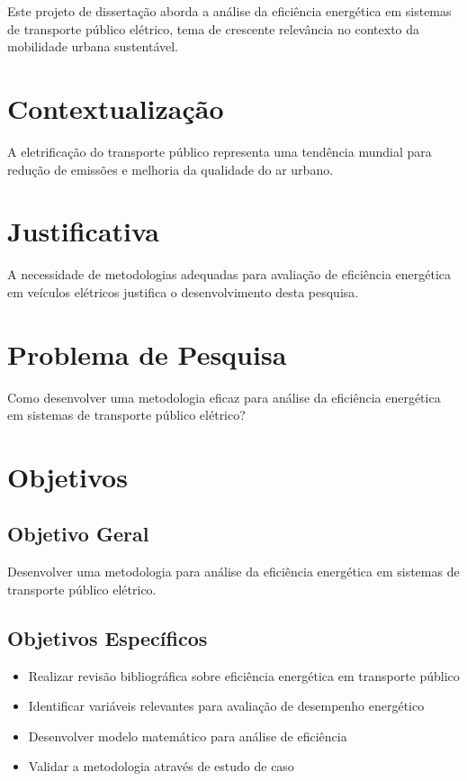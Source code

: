 \documentclass[qualificacao-mestrado,onehalfspacing,12pt,hyperref]{UnB-PPGT}
\begin{document}
Este projeto de dissertação aborda a análise da eficiência energética em sistemas de transporte público elétrico, tema de crescente relevância no contexto da mobilidade urbana sustentável.

\section{Contextualização}
\label{sec:contextualizacao}

A eletrificação do transporte público representa uma tendência mundial para redução de emissões e melhoria da qualidade do ar urbano.

\section{Justificativa}
\label{sec:justificativa}

A necessidade de metodologias adequadas para avaliação de eficiência energética em veículos elétricos justifica o desenvolvimento desta pesquisa.

\section{Problema de Pesquisa}
\label{sec:problema}

Como desenvolver uma metodologia eficaz para análise da eficiência energética em sistemas de transporte público elétrico?

\section{Objetivos}
\label{sec:objetivos}

\subsection{Objetivo Geral}
Desenvolver uma metodologia para análise da eficiência energética em sistemas de transporte público elétrico.

\subsection{Objetivos Específicos}
\begin{itemize}
\item Realizar revisão bibliográfica sobre eficiência energética em transporte público
\item Identificar variáveis relevantes para avaliação de desempenho energético
\item Desenvolver modelo matemático para análise de eficiência
\item Validar a metodologia através de estudo de caso
\end{itemize}
\end{document}
